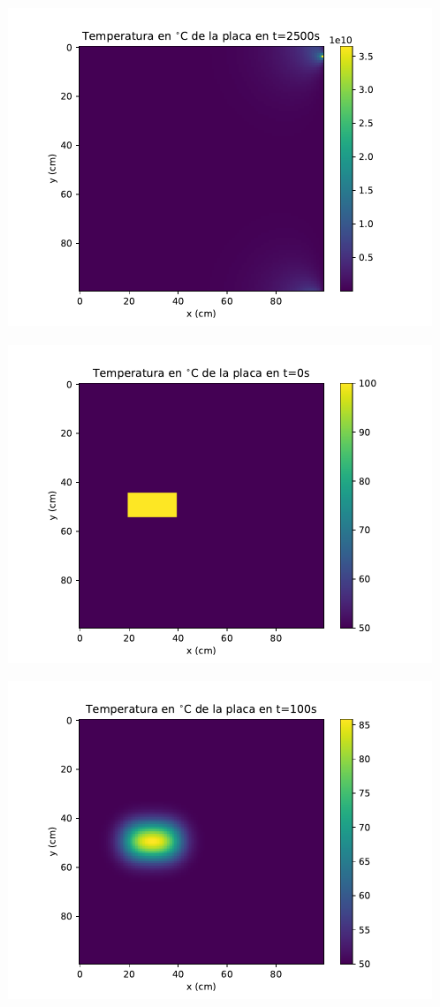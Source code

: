 \documentclass[12pt,letterpaper]{article}
\begin{document}
\begin{figure}[h]
\includegraphics{a2_2500.pdf}
\centering
\end{figure}

\begin{figure}[h]
\includegraphics{p1_0.pdf}
\centering
\end{figure}

\begin{figure}[h]
\includegraphics{p1_100.pdf}
\centering
\end{figure}
\end{document}
